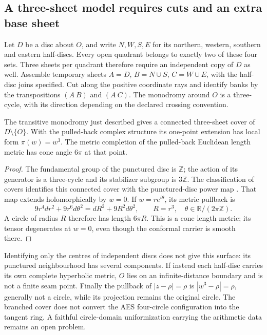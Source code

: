 \subsection{A three-sheet model requires cuts and an extra base sheet}

Let $D$ be a disc about $O$, and write $N,W,S,E$ for its northern, western,
southern and eastern half-discs.  Every open quadrant belongs to exactly two
of these four sets.  Three sheets per quadrant therefore require an
independent copy of $D$ as well.  Assemble temporary sheets
$A=D$, $B=N\cup S$, $C=W\cup E$, with the half-disc joins specified.
Cut along the positive coordinate rays and identify banks by the
transpositions $(A\ B)$ and $(A\ C)$.  The monodromy around $O$ is a
three-cycle, with its direction depending on the declared crossing convention.

\begin{proposition}
\label{prop:p0-three-sheet-cover}
The transitive monodromy just described gives a connected three-sheet cover
of $D\setminus\{O\}$.  With the pulled-back complex structure its one-point
extension has local form $\pi(w)=w^3$.  The metric completion of the pulled-back
Euclidean length metric has cone angle $6\pi$ at that point.
\end{proposition}

\begin{proof}
The fundamental group of the punctured disc is $\mathbb Z$; the action of its
generator is a three-cycle and its stabilizer subgroup is $3\mathbb Z$.
The classification of covers identifies this connected cover with the
punctured-disc power map \cite[\S1.3]{Hatcher2002}.  That map extends
holomorphically by $w=0$.  If $w=re^{i\theta}$, its metric pullback is
\[
 9r^4dr^2+9r^6d\theta^2=dR^2+9R^2d\theta^2,
 \qquad R=r^3,\quad \theta\in\mathbb R/(2\pi\mathbb Z).
\]
A circle of radius $R$ therefore has length $6\pi R$.  This is a cone length
metric; its tensor degenerates at $w=0$, even though the conformal carrier is
smooth there.
\end{proof}

Identifying only the centres of independent discs does not give this surface:
its punctured neighbourhood has several components.  If instead each
half-disc carries its own complete hyperbolic metric, $O$ lies on an
infinite-distance boundary and is not a finite seam point.  Finally the
pullback of $|z-\rho|=\rho$ is $|w^3-\rho|=\rho$, generally not a circle,
while its projection remains the original circle.  The branched cover does
not convert the AES four-circle configuration into the tangent ring.
A faithful circle-domain uniformization carrying the arithmetic data remains
an open problem.

